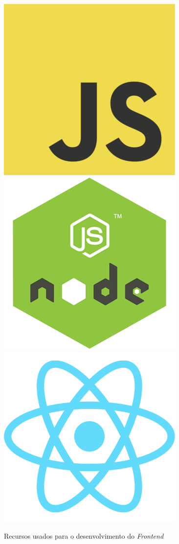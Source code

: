 \begin{figure}[htbp]
  \caption{Recursos usados para o desenvolvimento do \textit{Frontend}}
  \label{fig:frontend}
  \centering
  \begin{animateinline}{1}
    \includegraphics[scale=0.2]{./files/img/Codificacao/Animacao/JavaScript.png} %
    \includegraphics[scale=0.2]{./files/img/Codificacao/Animacao/NodeJS.png}     %
    \includegraphics[scale=0.2]{./files/img/Codificacao/Animacao/React.png}      %

\end{animateinline}
\end{figure}
